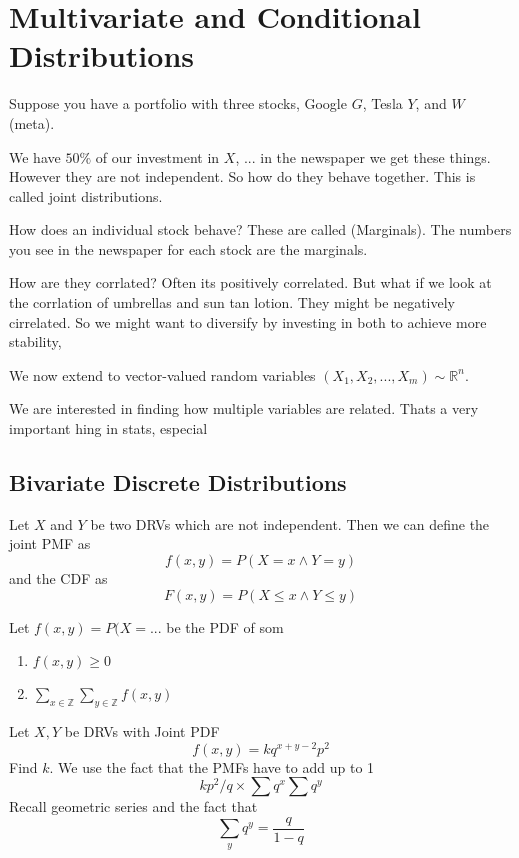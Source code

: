 \documentclass{report}
\begin{document}
\chapter{Multivariate and Conditional Distributions}
Suppose you have a portfolio with three stocks, Google $G$, Tesla $Y$, and $W$ (meta).

We have $50\%$ of our investment in $X$, ... in the newspaper we get these things. However they are not independent. So how do they behave together. This  is called joint distributions. 

How does an individual stock behave? These are called (Marginals). The numbers you see in the newspaper for each stock are the marginals.

How are they corrlated? Often its positively correlated. But what if we look at the corrlation of umbrellas and sun tan lotion. They might be negatively cirrelated. So we might want to diversify by investing in both to achieve more stability, 


We now extend to vector-valued random variables $(X_1,X_2,...,X_m)\sim\mathbb R^n$. 

We are interested in finding how multiple variables are related. Thats a very important hing in stats, especial


\section{Bivariate Discrete Distributions}
Let $X$ and $Y$ be two DRVs which are not independent. Then we can define the joint PMF as
\[
    f(x,y)=P(X=x\land Y=y)
\]
and the CDF as
\[
    F(x,y)=P(X\le x \land Y\le y)
\]

\begin{theorem}
    Let $f(x,y) = P(X=...$ be the PDF of som
    \begin{enumerate}
        \item $f(x,y)\ge 0$
        \item $\sum_{x\in\mathbb Z} \sum_{y\in\mathbb Z} f(x,y)$
    \end{enumerate}
\end{theorem}

\begin{example}
    Let $X,Y$ be DRVs with Joint PDF
    \[
        f(x,y)=kq^{x+y-2}p^2
    \]
    Find $k$.
    \solution
    We use the fact that the PMFs have to add up to 1
    \[
        kp^2/q \times \sum q^x \sum q^y
    \]
    Recall geometric series and the fact that 
    \[
        \sum_y q^y = \frac q {1-q}
    \]
\end{example}
\end{document}
